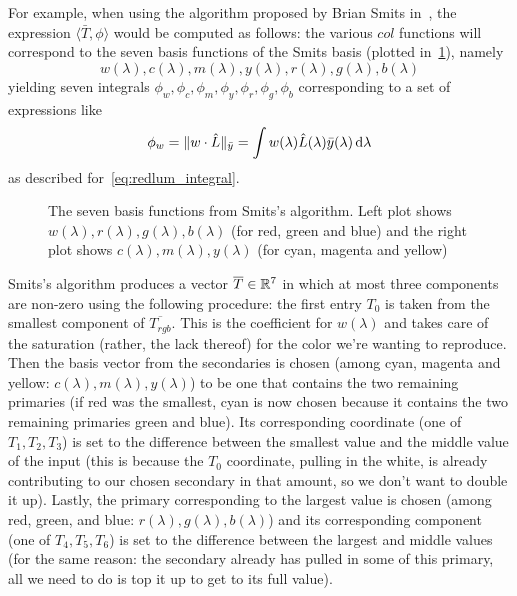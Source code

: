 For example, when using the algorithm proposed by Brian Smits in~\cite{smits99},
the expression $\langle \bar T, \phi \rangle$ would be computed as follows:
the various $col$ functions will correspond to the seven basis functions of the
Smits basis (plotted in~\cref{fig:smitsbasis}), namely 
\begin{equation*}
w(λ), c(λ), m(λ), y(λ), r(λ), g(λ), b(λ) 
\end{equation*}
yielding seven integrals
$\phi_w, \phi_c, \phi_m, \phi_y, \phi_r, \phi_g, \phi_b$ corresponding to
a set of expressions like
\begin{equation*}
\phi_w =  \|w\cdot\hat{L}\|_{\bar y} = \int w(\lambda) \hat{L}(\lambda) \bar y(\lambda) \d \lambda
\end{equation*}
as described for~\cref{eq:redlum_integral}.
	
\begin{figure}
\begin{center}
	\noindent{}
\end{center}
\caption{The seven basis functions from Smits's algorithm. Left plot shows 
	$w(λ), r(λ), g(λ), b(λ)$ (for red, green and blue) and the right plot shows
	$c(λ), m(λ), y(λ)$ (for cyan, magenta and yellow)
}
\label{fig:smitsbasis}
\end{figure}
	
Smits's algorithm produces a vector $\overline T \in \mathbb{R}^7$ in which at most three
components are non-zero using the following procedure: 
the first entry $T_0$ is taken from the smallest component of $\overline{T_{rgb}}$. 
This is the coefficient for $w(\lambda)$ and takes care of the saturation (rather,
the lack thereof) for the color we're wanting to reproduce.
Then the basis vector from the secondaries is chosen 
(among cyan, magenta and yellow: $c(\lambda), m(\lambda), y(\lambda)$) to
be one that contains the two remaining primaries (if red was the smallest,
cyan is now chosen because it contains the two remaining primaries green and blue).
Its corresponding coordinate (one of $T_1, T_2, T_3$) is set to the difference
between the smallest value and the middle value of the input (this is because the $T_0$ coordinate,
pulling in the white, is already contributing to our chosen secondary in that amount, so we
don't want to double it up). 
Lastly, the primary corresponding to the largest value is chosen 
(among red, green, and blue: $r(\lambda), g(\lambda), b(\lambda)$)
and its corresponding component (one of $T_4, T_5, T_6$) is set to the difference
between the largest and middle values (for the same reason: the secondary already has pulled in
some of this primary, all we need to do is top it up to get to its full value).

